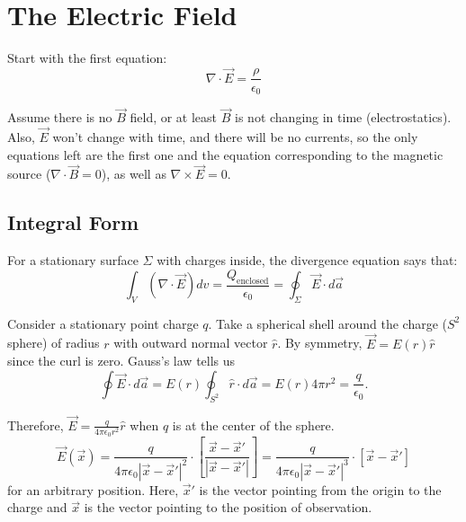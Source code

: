 \documentclass[a4paper,twoside,master.tex]{subfiles}
\begin{document}
\section{The Electric Field}%
\label{sec:the_electric_field}

Start with the first equation:
\begin{equation}
    \nabla\cdot\vec{E} = \frac{\rho}{\epsilon_0}
\end{equation}

Assume there is no $\vec{B}$ field, or at least $\vec{B}$ is not changing in time (electrostatics). Also, $\vec{E}$ won't change with time, and there will be no currents, so the only equations left are the first one and the equation corresponding to the magnetic source ($\nabla\cdot\vec{B} = 0$), as well as $\nabla\times\vec{E} = 0$.

\subsection{Integral Form}%
\label{sub:integral_form}

For a stationary surface $\Sigma$ with charges inside, the divergence equation says that:
\begin{equation}
    \int_V (\nabla\cdot\vec{E})dv = \frac{Q_\text{enclosed}}{\epsilon_0} = \oint_\Sigma\vec{E}\cdot d\vec{a}
\end{equation}

Consider a stationary point charge $q$. Take a spherical shell around the charge ($S^2$ sphere) of radius $r$ with outward normal vector $\hat{r}$. By symmetry, $\vec{E} = E(r)\hat{r}$ since the curl is zero. Gauss's law tells us
\begin{equation}
    \oint\vec{E}\cdot d\vec{a} = E(r)\oint_{S^2}\hat{r}\cdot d\vec{a} = E(r)4\pi r^2 = \frac{q}{\epsilon_0}.
\end{equation}

Therefore, $\vec{E} = \frac{q}{4\pi\epsilon_0 r^2}\hat{r}$ when $q$ is at the center of the sphere.
\begin{equation}
    \vec{E}(\vec{x}) = \frac{q}{4\pi\epsilon_0|\vec{x}-\vec{x}'|^2}\cdot\left[\frac{\vec{x}-\vec{x}'}{|\vec{x}-\vec{x}'|}\right] = \frac{q}{4\pi\epsilon_0|\vec{x}-\vec{x}'|^3}\cdot\left[\vec{x}-\vec{x}'\right]
\end{equation} for an arbitrary position. Here, $\vec{x}'$ is the vector pointing from the origin to the charge and $\vec{x}$ is the vector pointing to the position of observation.
\end{document}
